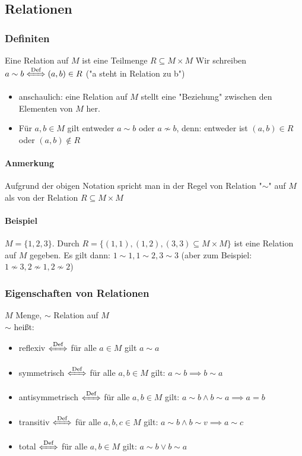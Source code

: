 \documentclass[a4paper]{scrartcl}
\theoremstyle{definition}
\theoremstyle{plain}
\theoremstyle{plain}
\theoremstyle{remark}
\theoremstyle{remark}
\theoremstyle{remark}
\theoremstyle{remark}
\theoremstyle{remark}
\begin{document}
\subsection{Relationen}
\label{sec-2-5}
\subsubsection{Definiten}
\label{sec-2-5-1}
Eine Relation auf $M$ ist eine Teilmenge $R\subseteq M\times M$
Wir schreiben $a\sim b \xLeftrightarrow{\text{Def}} (a,b) \in R$ ("a steht in Relation zu b")

\begin{itemize}
\item anschaulich: eine Relation auf $M$ stellt eine "Beziehung" zwischen den Elementen von $M$ her.
\item Für $a,b \in M$ gilt entweder $a\sim b$ oder $a\not\sim b$, denn: entweder ist $(a,b) \in R$ oder $(a,b)\not\in R$
\end{itemize}
\paragraph{Anmerkung}
\label{sec-2-5-1-1}
Aufgrund der obigen Notation spricht man in der Regel von Relation "$\sim$" auf $M$ als von der Relation $R \subseteq M\times M$
\paragraph{Beispiel}
\label{sec-2-5-1-2}
$M = \{1,2,3\}$. Durch $R = \{(1,1), (1,2), (3,3) \subseteq M\times M\}$ ist eine Relation auf $M$ gegeben. Es gilt dann: $1\sim 1, 1\sim 2, 3\sim 3$ (aber zum Beispiel: $1\not\sim 3, 2\not\sim 1, 2\not\sim 2$)

\subsubsection{Eigenschaften von Relationen}
\label{sec-2-5-2}
$M$ Menge, $\sim$ Relation auf $M$ \\
        $\sim$ heißt:
\begin{itemize}
\item reflexiv $\xLeftrightarrow{\text{Def}}$ für alle $a\in M$ gilt $a\sim a$
\item symmetrisch $\xLeftrightarrow{\text{Def}}$ für alle $a,b\in M$ gilt: $a\sim b \implies b\sim a$
\item antisymmetrisch $\xLeftrightarrow{\text{Def}}$ für alle $a,b \in M$ gilt: $a\sim b \wedge b\sim a \implies a = b$
\item transitiv $\xLeftrightarrow{\text{Def}}$ für alle $a,b,c\in M$ gilt: $a\sim b \wedge b\sim v \implies a\sim c$
\item total $\xLeftrightarrow{\text{Def}}$ für alle $a,b\in M$ gilt: $a\sim b \vee b\sim a$
\end{itemize}
\end{document}
